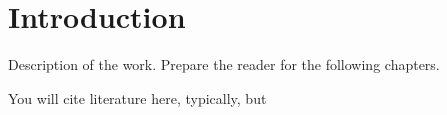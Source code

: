\chapter{Introduction} 

Description of the work. Prepare the reader for the following chapters.

You will cite literature here, typically, but

